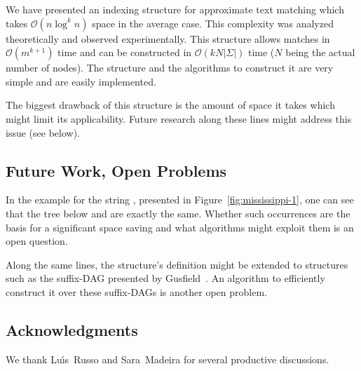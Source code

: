 We have presented an indexing structure for approximate text matching which takes $\mathcal{O}(n\log^k n)$ space in the average case. This complexity was analyzed theoretically and observed experimentally. This structure allows matches in $\mathcal{O}(m^{k+1})$ time and can be constructed in $\mathcal{O}(kN|\Sigma|)$ time ($N$ being the actual number of nodes). The structure and the algorithms to construct it are very simple and are easily implemented.

The biggest drawback of this structure is the amount of space it takes which might limit its applicability. Future research along these lines might address this issue (see below). 

\subsection{Future Work, Open Problems}\label{sec:future}

In the example for the string , presented in Figure~\ref{fig:mississippi-1}, one can see that the tree below  and  are exactly the same. Whether such occurrences are the basis for a significant space saving and what algorithms might exploit them is an open question.

Along the same lines, the structure's definition might be extended to structures such as the suffix-DAG presented by Gusfield~\cite[\S\,7.7]{gusfield:algorithms}. An algorithm to efficiently construct it over these suffix-DAGs is another open problem.

\subsection{Acknowledgments}

We thank Lu\'{\i}s~Russo and Sara~Madeira for several productive discussions.

